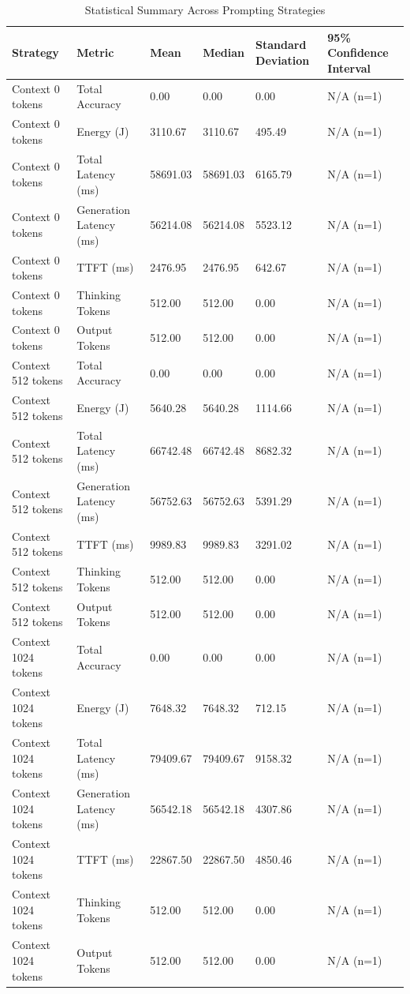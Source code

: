 \begin{table}
\caption{Statistical Summary Across Prompting Strategies}
\label{tab:statistical_summary}
\begin{tabular}{llllll}
\toprule
Strategy & Metric & Mean & Median & Standard Deviation & 95\% Confidence Interval \\
\midrule
Context 0 tokens & Total Accuracy & 0.00 & 0.00 & 0.00 & N/A (n=1) \\
Context 0 tokens & Energy (J) & 3110.67 & 3110.67 & 495.49 & N/A (n=1) \\
Context 0 tokens & Total Latency (ms) & 58691.03 & 58691.03 & 6165.79 & N/A (n=1) \\
Context 0 tokens & Generation Latency (ms) & 56214.08 & 56214.08 & 5523.12 & N/A (n=1) \\
Context 0 tokens & TTFT (ms) & 2476.95 & 2476.95 & 642.67 & N/A (n=1) \\
Context 0 tokens & Thinking Tokens & 512.00 & 512.00 & 0.00 & N/A (n=1) \\
Context 0 tokens & Output Tokens & 512.00 & 512.00 & 0.00 & N/A (n=1) \\
Context 512 tokens & Total Accuracy & 0.00 & 0.00 & 0.00 & N/A (n=1) \\
Context 512 tokens & Energy (J) & 5640.28 & 5640.28 & 1114.66 & N/A (n=1) \\
Context 512 tokens & Total Latency (ms) & 66742.48 & 66742.48 & 8682.32 & N/A (n=1) \\
Context 512 tokens & Generation Latency (ms) & 56752.63 & 56752.63 & 5391.29 & N/A (n=1) \\
Context 512 tokens & TTFT (ms) & 9989.83 & 9989.83 & 3291.02 & N/A (n=1) \\
Context 512 tokens & Thinking Tokens & 512.00 & 512.00 & 0.00 & N/A (n=1) \\
Context 512 tokens & Output Tokens & 512.00 & 512.00 & 0.00 & N/A (n=1) \\
Context 1024 tokens & Total Accuracy & 0.00 & 0.00 & 0.00 & N/A (n=1) \\
Context 1024 tokens & Energy (J) & 7648.32 & 7648.32 & 712.15 & N/A (n=1) \\
Context 1024 tokens & Total Latency (ms) & 79409.67 & 79409.67 & 9158.32 & N/A (n=1) \\
Context 1024 tokens & Generation Latency (ms) & 56542.18 & 56542.18 & 4307.86 & N/A (n=1) \\
Context 1024 tokens & TTFT (ms) & 22867.50 & 22867.50 & 4850.46 & N/A (n=1) \\
Context 1024 tokens & Thinking Tokens & 512.00 & 512.00 & 0.00 & N/A (n=1) \\
Context 1024 tokens & Output Tokens & 512.00 & 512.00 & 0.00 & N/A (n=1) \\
\bottomrule
\end{tabular}
\end{table}
